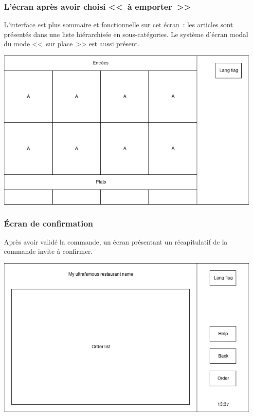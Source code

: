 \documentclass[a4paper,12pt]{article}
\begin{document}
\subsubsection{L'écran après avoir choisi <<~à emporter~>>}

L'interface est plus sommaire et fonctionnelle sur cet écran~: les articles sont présentés dans une liste hiérarchisée
en sous-catégories. Le système d'écran modal du mode <<~sur place~>> est aussi présent.

\begin{center}
	\includegraphics[width=\textwidth]{takeaway_screen.jpg}
\end{center}

\subsubsection{Écran de confirmation}
Après avoir validé la commande, un écran présentant un récapitulatif de la commande invite à confirmer.

\begin{center}
	\includegraphics[width=\textwidth]{confirmation_screen.jpg}
\end{center}
\end{document}
